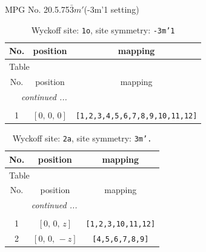 \documentclass[fleqn,8pt]{jsarticle}
\begin{document}
\setcounter{MaxMatrixCols}{32}

\renewcommand{\tablename}{Table~}
\renewcommand{\figurename}{Figure~}
\begin{center}
\LARGE
MPG No. 20.5.75\quad$\bar{3}m'$\quad(-3m'1 setting)
\end{center}
\renewcommand{\arraystretch}{1.2}
\begin{longtable}{ccc}
\caption{Wyckoff site: {\tt 1o}, site symmetry: {\tt -3m'1}}
 \\
 \hline \hline
No. & position & mapping \\ \hline \endfirsthead

\multicolumn{2}{l}{\tablename\ \thetable{}} \\
 \hline \hline
No. & position & mapping \\ \hline \endhead

 \hline \hline
\multicolumn{2}{r}{\footnotesize\it continued ...} \\ \endfoot

 \hline \hline
\multicolumn{2}{r}{} \\ \endlastfoot

1 & $\left[ 0,\, 0,\, 0 \right]$ & {\tt [1,2,3,4,5,6,7,8,9,10,11,12]} \\
\end{longtable}
\renewcommand{\arraystretch}{1.2}
\begin{longtable}{ccc}
\caption{Wyckoff site: {\tt 2a}, site symmetry: {\tt 3m'.}}
 \\
 \hline \hline
No. & position & mapping \\ \hline \endfirsthead

\multicolumn{2}{l}{\tablename\ \thetable{}} \\
 \hline \hline
No. & position & mapping \\ \hline \endhead

 \hline \hline
\multicolumn{2}{r}{\footnotesize\it continued ...} \\ \endfoot

 \hline \hline
\multicolumn{2}{r}{} \\ \endlastfoot

1 & $\left[ 0,\, 0,\, z \right]$ & {\tt [1,2,3,10,11,12]} \\ \hline
2 & $\left[ 0,\, 0,\, - z \right]$ & {\tt [4,5,6,7,8,9]} \\
\end{longtable}
\renewcommand{\arraystretch}{1.2}
\end{document}
